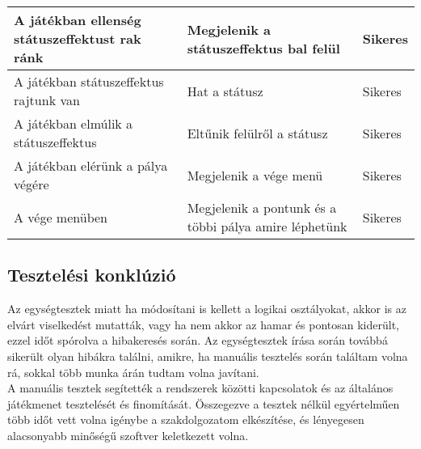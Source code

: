\begin{center}
\begin{longtable}{| m{} | m{} | m{}|}
		A játékban ellenség státuszeffektust rak ránk & Megjelenik a státuszeffektus bal felül & Sikeres\\ \hline
		
		A játékban státuszeffektus rajtunk van & Hat a státusz & Sikeres\\ \hline
		
		A játékban elmúlik a státuszeffektus & Eltűnik felülről a státusz & Sikeres\\ \hline
		
		A játékban elérünk a pálya végére & Megjelenik a vége menü & Sikeres\\ \hline
		
		A vége menüben & Megjelenik a pontunk és a többi pálya amire léphetünk & Sikeres\\ \hline
		
	\end{longtable}
\end{center}

\subsection{Tesztelési konklúzió}

Az egységtesztek miatt ha módosítani is kellett a logikai osztályokat, akkor is az elvárt viselkedést mutatták, vagy ha nem akkor az hamar és pontosan kiderült, ezzel időt spórolva a hibakeresés során. Az egységtesztek írása során továbbá sikerült olyan hibákra találni, amikre, ha manuális tesztelés során találtam volna rá, sokkal több munka árán tudtam volna javítani.\\
A manuális tesztek segítették a rendszerek közötti kapcsolatok és az általános játékmenet tesztelését és finomítását. Összegezve a tesztek nélkül egyértelműen több időt vett volna igénybe a szakdolgozatom elkészítése, és lényegesen alacsonyabb minőségű szoftver keletkezett volna.